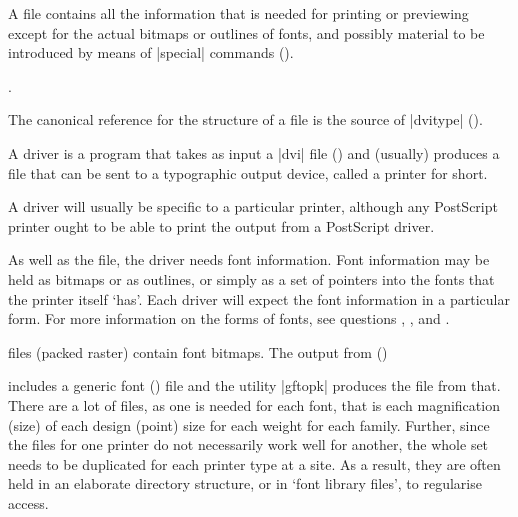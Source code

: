 A  file contains all the information that is needed for printing 
or previewing except for the actual bitmaps or outlines of fonts, and 
possibly material to be introduced by means of
\htmlignore
\cs|special| commands ().
\endhtmlignore
\begin{htmlversion}
  .
\end{htmlversion}

The canonical reference for the structure of a  file is the
source of \ProgName|dvitype| ().



A driver is a program that takes as input a |dvi| file
()  and
(usually) produces a file that can be sent to a typographic
output device, called a printer for short.

A driver will usually be specific to a particular printer,
although any PostScript printer ought to be able to print
the output from a PostScript driver.

As well as the  file, the driver needs font information.
Font information may be held as bitmaps or as outlines, or simply as a
set of pointers into the fonts that the printer itself `has'.
Each driver will expect the font information in
a particular form.  For more information on the forms of fonts,
see questions ,
,
and .



 files (packed raster) contain font bitmaps. The output
from
\htmlignore
\MF{} ()
\endhtmlignore
\begin{htmlversion}
\end{htmlversion}
includes a generic font () file and the
utility \ProgName|gftopk| produces the  file from that.
There are a lot of  files, as one is needed for each font,
that is each magnification (size) of each design (point) size for each
weight for each family.  Further, since the  files for one printer
do not necessarily work well for another, the whole set needs to be
duplicated for each printer type at a site.  As a result, they are
often held in an elaborate directory structure, or in `font library
files', to regularise access.


